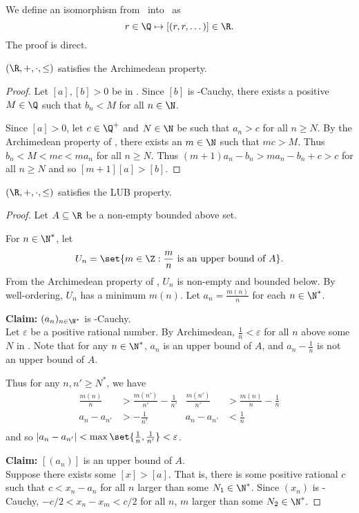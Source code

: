 
We define an isomorphism from \Q\ into \R\ as \[
    r \in \Q \mapsto [(r, r, \dots)] \in \R.
\] The proof is direct.
\begin{theorem*}
    $(\R, +, \cdot, \le)$ satisfies the Archimedean property.
\end{theorem*}
\begin{proof}
    Let $[a], [b] > 0$ be in \R.
    Since $[b]$ is \Q-Cauchy, there exists a positive $M \in \Q$ such that
    $b_n < M$ for all $n \in \N$.

    Since $[a] > 0$, let $c \in \Q^+$ and $N \in \N$ be such that $a_n > c$
    for all $n \ge N$.
    By the Archimedean property of \Q, there exists an $m \in \N$ such that
    $m c > M$.
    Thus $b_n < M < m c < m a_n$ for all $n \ge N$.
    Thus $(m + 1) a_n - b_n > m a_n - b_n + c > c$ for all $n \ge N$ and so
    $[m + 1] [a] > [b]$.
\end{proof}

\begin{theorem*}
    $(\R, +, \cdot, \le)$ satisfies the LUB property.
\end{theorem*}
\begin{proof}
    Let $A \subseteq \R$ be a non-empty bounded above set.

    For $n \in \N^*$, let \[
        U_n = \set{m \in \Z : \frac mn \text{ is an upper bound of } A}.
    \]
    From the Archimedean property of \R, $U_n$ is non-empty and bounded below.
    By well-ordering, $U_n$ has a minimum $m(n)$.
    Let $a_n = \frac{m(n)}{n}$ for each $n \in \N^*$.

    \textbf{Claim:} $(a_n)_{n \in \N^*}$ is \Q-Cauchy. \\
    Let $\varepsilon$ be a positive rational number.
    By Archimedean, $\frac1n < \varepsilon$ for all $n$ above some $N$ in \N.
    Note that for any $n \in \N^*$, $a_n$ is an upper bound of $A$, and
    $a_n - \frac1n$ is not an upper bound of $A$.

    Thus for any $n, n' \ge N^*$, we have \begin{align*}
        \frac{m(n)}{n} &> \frac{m(n')}{n'} - \frac1{n'}
            & \frac{m(n')}{n'} &> \frac{m(n)}{n} - \frac1n \\
        a_n - a_{n'} &> -\frac1{n'} & a_n - a_{n'} &< \frac1n \\
    \end{align*}
    and so $|a_n - a_{n'}| < \max\set{\frac1n, \frac1{n'}} < \varepsilon$.

    \textbf{Claim:} $[(a_n)]$ is an upper bound of $A$. \\
    Suppose there exists some $[x] > [a]$.
    That is, there is some positive rational $c$ such that $c < x_n - a_n$
    for all $n$ larger than some $N_1 \in \N^*$.
    Since $(x_n)$ is \Q-Cauchy, $-c/2 < x_n - x_m < c/2$ for all $n$, $m$
    larger than some $N_2 \in \N^*$. %
\end{proof}
